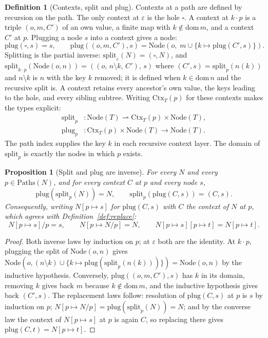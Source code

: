 \documentclass[11pt]{article}
\newtheorem{proposition}[theorem]{Proposition}
\theoremstyle{definition}
\newtheorem{definition}[theorem]{Definition}
\newcommand{\NodeT}[1]{\mathrm{Node}(#1)}
\newcommand{\dom}{\mathrm{dom}\,}
\newcommand{\Paths}{\mathrm{Paths}}
\begin{document}
\begin{definition}[Contexts, split and plug]\label{def:context}
Contexts at a path are defined by recursion on the path. The only context at
$\varepsilon$ is the hole $\square$. A context at $k \cdot p$ is a triple $(o, m, C')$ of an
own value, a finite map with $k \notin \dom m$, and a context $C'$ at $p$. Plugging a node
$s$ into a context gives a node:
\[
\mathrm{plug}(\square, s) = s, \qquad
\mathrm{plug}((o, m, C'), s) = \mathrm{Node}(o,\; m \cup \{k \mapsto \mathrm{plug}(C', s)\}).
\]
Splitting is the partial inverse: $\mathrm{split}_{\varepsilon}(N) = (\square, N)$, and
$\mathrm{split}_{k \cdot p}(\mathrm{Node}(o, n)) = ((o,\, n \setminus k,\, C'),\, s)$ where
$(C', s) = \mathrm{split}_p(n(k))$ and $n \setminus k$ is $n$ with the key $k$ removed; it is
defined when $k \in \dom n$ and the recursive split is.
A context retains every ancestor's own value, the keys leading to the hole, and every
sibling subtree. Writing $\mathrm{Ctx}_T(p)$ for these contexts makes the types explicit:
\[
\begin{aligned}
\mathrm{split}_p &: \NodeT{T} \rightharpoonup
  \mathrm{Ctx}_T(p) \times \NodeT{T},\\
\mathrm{plug}_p &: \mathrm{Ctx}_T(p) \times \NodeT{T} \longrightarrow \NodeT{T}.
\end{aligned}
\]
The path index supplies the key $k$ in each recursive context layer. The domain of
$\mathrm{split}_p$ is exactly the nodes in which $p$ exists.
\end{definition}

\begin{proposition}[Split and plug are inverse]\label{prop:splitplug}
For every $N$ and every $p \in \Paths(N)$, and for every context $C$ at $p$ and every
node $s$,
\[
\mathrm{plug}(\mathrm{split}_p(N)) = N, \qquad
\mathrm{split}_p(\mathrm{plug}(C, s)) = (C, s).
\]
Consequently, writing $N[p \mapsto s]$ for $\mathrm{plug}(C, s)$ with $C$ the context of
$N$ at $p$, which agrees with Definition~\ref{def:replace}:
\[
N[p \mapsto s]/p = s, \qquad N[p \mapsto N/p] = N, \qquad
N[p \mapsto s][p \mapsto t] = N[p \mapsto t].
\]
\end{proposition}

\begin{proof}
Both inverse laws by induction on $p$; at $\varepsilon$ both are the identity. At
$k \cdot p$, plugging the split of $\mathrm{Node}(o, n)$ gives
$\mathrm{Node}(o, (n \setminus k) \cup \{k \mapsto \mathrm{plug}(\mathrm{split}_p(n(k)))\})
= \mathrm{Node}(o, n)$ by the inductive hypothesis. Conversely,
$\mathrm{plug}((o, m, C'), s)$ has $k$ in its domain, removing $k$ gives back $m$ because
$k \notin \dom m$, and the inductive hypothesis gives back $(C', s)$. The replacement laws
follow: resolution of $\mathrm{plug}(C, s)$ at $p$ is $s$ by induction on $p$;
$N[p \mapsto N/p] = \mathrm{plug}(\mathrm{split}_p(N)) = N$; and by the converse law the
context of $N[p \mapsto s]$ at $p$ is again $C$, so replacing there gives
$\mathrm{plug}(C, t) = N[p \mapsto t]$.
\end{proof}
\end{document}
